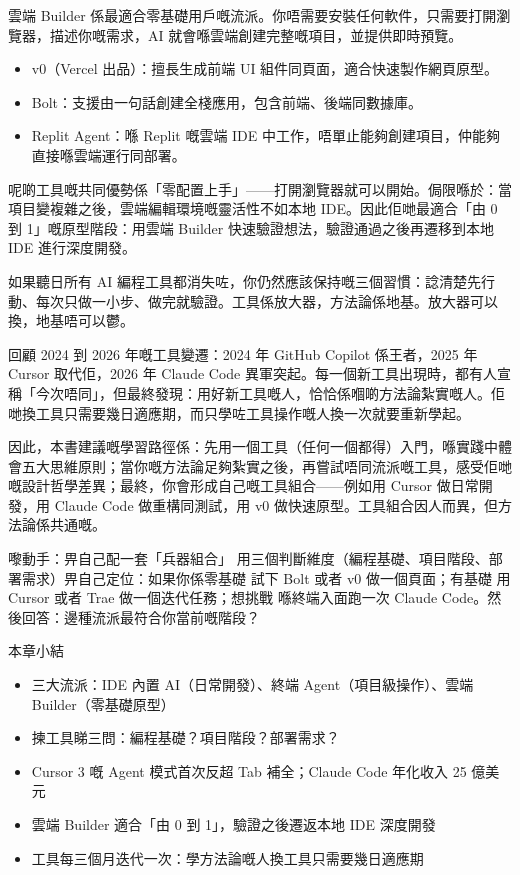 雲端 Builder 係最適合零基礎用戶嘅流派。你唔需要安裝任何軟件，只需要打開瀏覽器，描述你嘅需求，AI 就會喺雲端創建完整嘅項目，並提供即時預覽。

\begin{itemize}
  \item v0（Vercel 出品）：擅長生成前端 UI 組件同頁面，適合快速製作網頁原型。
  \item Bolt：支援由一句話創建全棧應用，包含前端、後端同數據庫。
  \item Replit Agent：喺 Replit 嘅雲端 IDE 中工作，唔單止能夠創建項目，仲能夠直接喺雲端運行同部署。
\end{itemize}

呢啲工具嘅共同優勢係「零配置上手」——打開瀏覽器就可以開始。侷限喺於：當項目變複雜之後，雲端編輯環境嘅靈活性不如本地 IDE。因此佢哋最適合「由 0 到 1」嘅原型階段：用雲端 Builder 快速驗證想法，驗證通過之後再遷移到本地 IDE 進行深度開發。


如果聽日所有 AI 編程工具都消失咗，你仍然應該保持嘅三個習慣：諗清楚先行動、每次只做一小步、做完就驗證。工具係放大器，方法論係地基。放大器可以換，地基唔可以鬱。

回顧 2024 到 2026 年嘅工具變遷：2024 年 GitHub Copilot 係王者，2025 年 Cursor 取代佢，2026 年 Claude Code 異軍突起。每一個新工具出現時，都有人宣稱「今次唔同」，但最終發現：用好新工具嘅人，恰恰係嗰啲方法論紮實嘅人。佢哋換工具只需要幾日適應期，而只學咗工具操作嘅人換一次就要重新學起。

因此，本書建議嘅學習路徑係：先用一個工具（任何一個都得）入門，喺實踐中體會五大思維原則；當你嘅方法論足夠紮實之後，再嘗試唔同流派嘅工具，感受佢哋嘅設計哲學差異；最終，你會形成自己嘅工具組合——例如用 Cursor 做日常開發，用 Claude Code 做重構同測試，用 v0 做快速原型。工具組合因人而異，但方法論係共通嘅。

\begin{tcbpractice}{嚟動手：畀自己配一套「兵器組合」}
用三個判斷維度（編程基礎、項目階段、部署需求）畀自己定位：如果你係零基礎 試下 Bolt 或者 v0 做一個頁面；有基礎 用 Cursor 或者 Trae 做一個迭代任務；想挑戰 喺終端入面跑一次 Claude Code。然後回答：邊種流派最符合你當前嘅階段？

\end{tcbpractice}

\begin{tcbsummary}{本章小結}
\begin{itemize}
  \item 三大流派：IDE 內置 AI（日常開發）、終端 Agent（項目級操作）、雲端 Builder（零基礎原型）
  \item 揀工具睇三問：編程基礎？項目階段？部署需求？
  \item Cursor 3 嘅 Agent 模式首次反超 Tab 補全；Claude Code 年化收入 25 億美元
  \item 雲端 Builder 適合「由 0 到 1」，驗證之後遷返本地 IDE 深度開發
  \item 工具每三個月迭代一次：學方法論嘅人換工具只需要幾日適應期
\end{itemize}

\end{tcbsummary}
